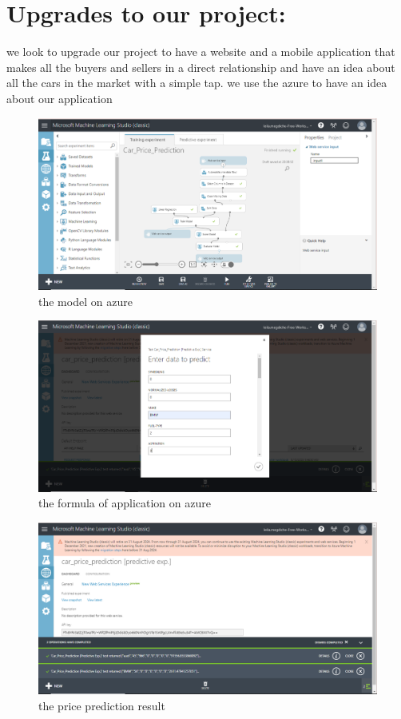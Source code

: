 \documentclass{article}
\begin{document}
\section{ Upgrades to our project:}
we look to upgrade our project to have a website and a mobile application that makes all the buyers and sellers in a direct relationship and have an idea about all the cars in the market with a simple tap.
we use the azure to have an idea about our application \\
\begin{figure}[h]
    \centering
    \includegraphics[width=1\textwidth]{azure1.png}
    \caption{the model on azure}
    \label{fig:my_label}
\end{figure}
\begin{figure}[h]
    \centering
    \includegraphics[width=1\textwidth]{azure2.png}
    \caption{the formula of application on azure }
    \label{fig:my_label}
\end{figure}
\begin{figure}[h]
    \centering
    \includegraphics[width=1\textwidth]{azure3.png}
    \caption{the price prediction result}
    \label{fig:my_label}
\end{figure}
\end{document}
